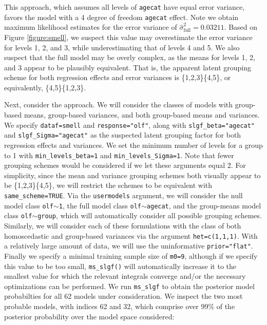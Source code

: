 This approach, which assumes all levels of \texttt{agecat} have equal error variance, favors the model with a 4 degree of freedom \texttt{agecat} effect. Note we obtain maximum likelihood estimates for the error variance of  $\hat{\sigma}^2_{\text{full}}=0.03211$. Based on Figure \ref{figure:smell}, we suspect this value may overestimate the error variance for levels 1, 2, and 3, while underestimating that of levels 4 and 5. We also suspect that the full model may be overly complex, as the means for levels 1, 2, and 3 appear to be plausibly equivalent. That is, the apparent latent grouping scheme for both regression effects and error variances is \{1,2,3\}\{4,5\}, or equivalently, \{4,5\}\{1,2,3\}. 

Next, consider the  approach. We will consider the classes of models with group-based means, group-based variances, and both group-based means and variances. We specify \texttt{dataf=smell} and \texttt{response="olf"}, along with \texttt{slgf\_beta="agecat"} and \texttt{slgf\_Sigma="agecat"} as the suspected latent grouping factor for both regression effects and variances. We set the minimum number of levels for a group to 1 with \texttt{min\_levels\_beta=1} and \texttt{min\_levels\_Sigma=1}. Note that fewer grouping schemes would be considered if we let these arguments equal 2. For simplicity, since the mean and variance grouping schemes both visually appear to be \{1,2,3\}\{4,5\}, we will restrict the schemes to be equivalent with \texttt{same\_scheme=TRUE}. Via the \texttt{usermodels} argument, we will consider the null model class \texttt{olf}$\sim$\texttt{1}, the full model class \texttt{olf}$\sim$\texttt{agecat}, and the group-means model class \texttt{olf}$\sim$\texttt{group}, which will automatically consider all possible grouping schemes. Similarly, we will consider each of these formulations with the class of both homoscedastic and group-based variances via the argument \texttt{het=c(1,1,1)}. With a relatively large amount of data, we will use the uninformative \texttt{prior="flat"}. Finally we specify a minimal training sample size of \texttt{m0=9}, although if we specify this value to be too small, \texttt{ms\_slgf()} will automatically increase it to the smallest value for which the relevant integrals converge and/or the necessary optimizations can be performed. We run \texttt{ms\_slgf} to obtain the posterior model probabilties for all 62 models under consideration. We inspect the two most probable models, with indices 62 and 32, which comprise over 99\% of the posterior probability over the model space considered: 

